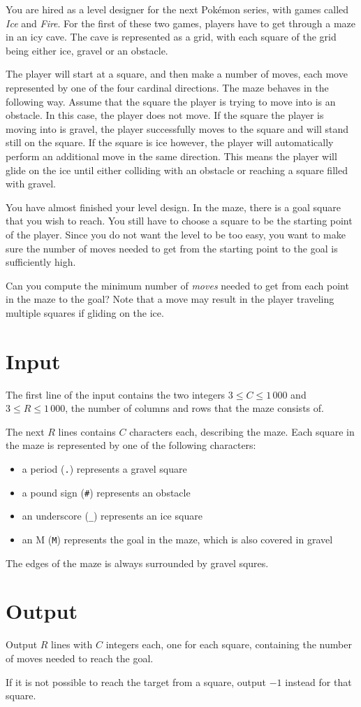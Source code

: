 You are hired as a level designer for the next Pokémon series, with games called \emph{Ice} and \emph{Fire}.
For the first of these two games, players have to get through a maze in an icy cave.
The cave is represented as a grid, with each square of the grid being either ice, gravel or an obstacle.

The player will start at a square, and then make a number of moves, each move represented by one of the four cardinal directions.
The maze behaves in the following way.
Assume that the square the player is trying to move into is an obstacle.
In this case, the player does not move.
If the square the player is moving into is gravel, the player successfully moves to the square and will stand still on the square.
If the square is ice however, the player will automatically perform an additional move in the same direction.
This means the player will glide on the ice until either colliding with an obstacle or reaching a square filled with gravel.

You have almost finished your level design.
In the maze, there is a goal square that you wish to reach.
You still have to choose a square to be the starting point of the player.
Since you do not want the level to be too easy, you want to make sure the number of moves needed to get from the starting point to the goal is sufficiently high.

Can you compute the minimum number of \emph{moves} needed to get from each point in the maze to the goal?
Note that a move may result in the player traveling multiple squares if gliding on the ice.

\section*{Input}
The first line of the input contains the two integers $3 \le C \le 1\,000$ and $3 \le R \le 1\,000$, the number of columns and rows that the maze consists of.

The next $R$ lines contains $C$ characters each, describing the maze.
Each square in the maze is represented by one of the following characters:
\begin{itemize}
\item a period (\texttt{.}) represents a gravel square
\item a pound sign (\texttt{\#}) represents an obstacle
\item an underscore (\texttt{\_}) represents an ice square
\item an M (\texttt{M}) represents the goal in the maze, which is also covered in gravel
\end{itemize}

The edges of the maze is always surrounded by gravel squres.

\section*{Output}
Output $R$ lines with $C$ integers each, one for each square, containing the number of moves needed to reach the goal.

If it is not possible to reach the target from a square, output $-1$ instead for that square.
